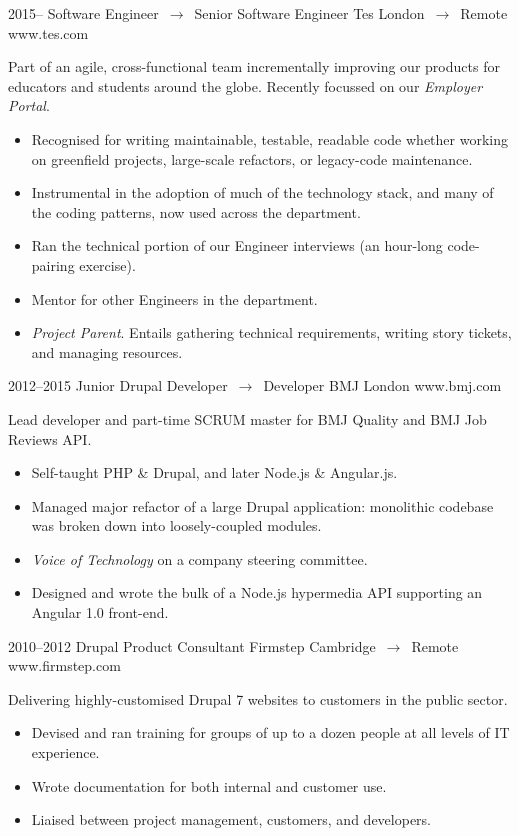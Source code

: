 \documentclass[11pt, a4paper, sans]{moderncv}
\begin{document}
\cventry
  {2015--}
  {Software Engineer $\,\to\,$ Senior Software Engineer}
  {Tes}
  {London $\,\to\,$ Remote}
  {www.tes.com}
  {
    Part of an agile, cross-functional team incrementally improving our products for educators and students around the globe. Recently focussed on our \emph{Employer Portal}.
    \begin{itemize}
      \item Recognised for writing maintainable, testable, readable code whether working on greenfield projects, large-scale refactors, or legacy-code maintenance.
      \item Instrumental in the adoption of much of the technology stack, and many of the coding patterns, now used across the department.
      \item Ran the technical portion of our Engineer interviews (an hour-long code-pairing exercise).
      \item Mentor for other Engineers in the department.
      \item \emph{Project Parent}. Entails gathering technical requirements, writing story tickets, and managing resources.
    \end{itemize}
  }

\vspace*{3mm}

\cventry
  {2012--2015}
  {Junior Drupal Developer $\,\to\,$ Developer}
  {BMJ}
  {London}
  {www.bmj.com}
  {
    Lead developer and part-time SCRUM master for BMJ Quality and BMJ Job Reviews API.
    \begin{itemize}
      \item Self-taught PHP \& Drupal, and later Node.js \& Angular.js.
      \item Managed major refactor of a large Drupal application: monolithic codebase was broken down into loosely-coupled modules.
      \item \emph{Voice of Technology} on a company steering committee.
      \item Designed and wrote the bulk of a Node.js hypermedia API supporting an Angular 1.0 front-end.
    \end{itemize}
  }

\vspace*{3mm}

\cventry
  {2010--2012}
  {Drupal Product Consultant}
  {Firmstep}
  {Cambridge $\,\to\,$ Remote}
  {www.firmstep.com}
  {
    Delivering highly-customised Drupal 7 websites to customers in the public sector.
    \begin{itemize}
      \item Devised and ran training for groups of up to a dozen people at all levels of IT experience.
      \item Wrote documentation for both internal and customer use.
      \item Liaised between project management, customers, and developers.
    \end{itemize}
  }
\end{document}
